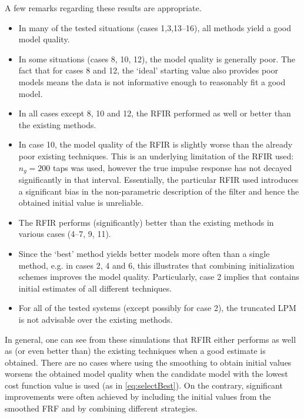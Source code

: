 A few remarks regarding these results are appropriate.
\begin{itemize}
  \item In many of the tested situations (cases 1,3,13--16), all methods yield a good model quality.
  \item In some situations (cases 8, 10, 12), the model quality is generally poor. 
  The fact that for cases 8 and 12, the `ideal' starting value  also provides poor models means the data is not informative enough to reasonably fit a good model.
  \item In all cases except 8, 10 and 12, the RFIR performed as well or better than the existing methods.
  \item In case 10, the model quality of the RFIR is slightly worse than the already poor existing techniques.
  This is an underlying limitation of the RFIR used: $n_g=200$ taps was used, however the true impulse response has not decayed significantly in that interval.
  Essentially, the particular RFIR used introduces a significant bias in the non-parametric description of the filter and hence the obtained initial value is unreliable.
  \item The RFIR performs (significantly) better than the existing methods in various cases (4--7, 9, 11).
  \item Since the `best' method  yields better models more often than a single method, e.g. in cases 2, 4 and 6, this illustrates that combining initialization schemes improves the model quality.
  Particularly, case 2 implies that  contains initial estimates of all different techniques.
  \item For all of the tested systems (except possibly for case 2), the truncated LPM is not advisable over the existing methods.
\end{itemize}

In general, one can see from these simulations that \gls{RFIR} either performs as well as (or even better than) the existing techniques when a good estimate is obtained.
There are no cases where using the smoothing to obtain initial values worsens the obtained model quality when the candidate model with the lowest cost function value is used (as in \eqref{eq:selectBest}).
On the contrary, significant improvements were often achieved by including the initial values from the smoothed FRF and by combining different strategies.

